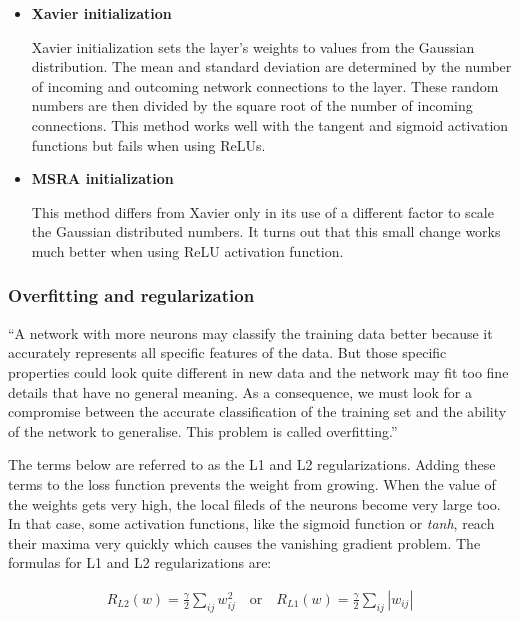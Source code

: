 \begin{itemize}
	\item \textbf{Xavier initialization}
		
	Xavier initialization sets the layer’s weights to values from the Gaussian distribution. The mean and standard deviation are determined by the number of incoming and outcoming network connections to the layer. These random numbers are then divided by the square root of the number of incoming connections. This method works well with the tangent and sigmoid activation functions but fails when using ReLUs. \cite{stanford-L6}
	
	\item \textbf{MSRA initialization}

	This method differs from Xavier only in its use of a different factor to scale the Gaussian distributed numbers. It turns out that this small change works much better when using ReLU activation function. \cite{stanford-L6}
	
\end{itemize}

\subsubsection{Overfitting and regularization}

\enquote{A network with more neurons may classify the training data better because it accurately represents all specific features of the data. But those specific properties could look quite different in new data and the network may fit too fine details that have no general meaning. As a consequence, we must look for a compromise between the accurate classification of the training set and the ability of the network to generalise. This problem is called overfitting.} \cite{mehlig}

The terms below are referred to as the L1 and L2 regularizations. Adding these terms to the loss function prevents the weight from growing. When the value of the weights gets very high, the local fileds of the neurons become very large too. In that case, some activation functions, like the sigmoid function or \textit{tanh}, reach their maxima very quickly which causes the vanishing gradient problem. The formulas for L1 and L2 regularizations are: \cite{mehlig}

\begin{gather}
	R_{L2}(w) = \frac{\gamma}{2} \sum\limits_{ij} w_{ij}^{2} \quad \text{or} \quad R_{L1}(w) = \frac{\gamma}{2} \sum\limits_{ij} |w_{ij}|
\end{gather}

